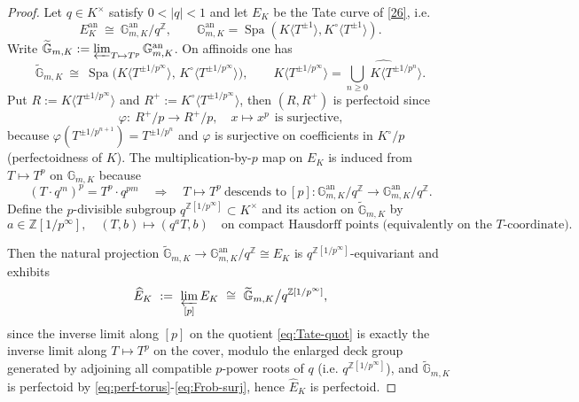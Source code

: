 \documentclass[11pt]{article}
\theoremstyle{remark}
\newcommand{\G}{\mathbb{G}}
\newcommand{\Z}{\mathbb{Z}}
\DeclareMathOperator{\Spa}{Spa}
\newcommand{\an}{\mathrm{an}}
\begin{document}
\begin{proof}
Let $q\in K^\times$ satisfy $0<|q|<1$ and let $E_K$ be the Tate curve of \eqref{26}, i.e.
\begin{equation}\label{eq:Tate-quot}
E_K^{\an}\ \cong\ \G_{m,K}^{\an}/q^{\Z},\qquad \G_{m,K}^{\an}=\Spa(K\langle T^{\pm 1}\rangle,K^\circ\langle T^{\pm 1}\rangle).
\end{equation}
Write $\widetilde{\G}_{m,K}:=\varprojlim_{T\mapsto T^p}\G_{m,K}^{\an}$. On affinoids one has
\begin{equation}\label{eq:perf-torus}
\widetilde{\G}_{m,K}\ \cong\ \Spa\!\bigl(K\langle T^{\pm 1/p^\infty}\rangle,\,K^\circ\langle T^{\pm 1/p^\infty}\rangle\bigr),
\qquad K\langle T^{\pm 1/p^\infty}\rangle=\widehat{\bigcup_{n\ge 0}K\langle T^{\pm 1/p^n}\rangle}.
\end{equation}
Put $R:=K\langle T^{\pm 1/p^\infty}\rangle$ and $R^+:=K^\circ\langle T^{\pm 1/p^\infty}\rangle$, then $(R,R^+)$ is perfectoid since
\begin{equation}\label{eq:Frob-surj}
\varphi:\ R^+/p\longrightarrow R^+/p,\quad x\mapsto x^p\ \ \text{is surjective,}
\end{equation}
because $\varphi(T^{\pm 1/p^{n+1}})=T^{\pm 1/p^n}$ and $\varphi$ is surjective on coefficients in $K^\circ/p$ (perfectoidness of $K$).
The multiplication-by-$p$ map on $E_K$ is induced from $T\mapsto T^p$ on $\G_{m,K}$ because
\begin{equation}\label{eq:p-descend}
(T\cdot q^m)^p=T^p\cdot q^{pm}\quad\Rightarrow\quad T\mapsto T^p\ \text{descends to}\ [p]:\G_{m,K}^{\an}/q^{\Z}\to \G_{m,K}^{\an}/q^{\Z}.
\end{equation}
Define the $p$-divisible subgroup $q^{\Z[1/p^\infty]}\subset K^\times$ and its action on $\widetilde{\G}_{m,K}$ by
\begin{equation}\label{eq:q-action}
a \in \mathbb{Z}[1/p^{\infty}], \quad
(T,b) \longmapsto (q^{a} T, b)
\quad \text{on compact Hausdorff points
(equivalently on the $T$-coordinate).}
\end{equation}

Then the natural projection $\widetilde{\G}_{m,K}\to \G_{m,K}^{\an}/q^\Z\cong E_K$ is $q^{\Z[1/p^\infty]}$-equivariant and exhibits
\begin{equation}\label{eq:perfectoid-Tate-ident}
\widehat{E}_K\ :=\ \varprojlim_{[p]}E_K\ \cong\ \widetilde{\G}_{m,K}\big/q^{\Z[1/p^\infty]},
\end{equation}
since the inverse limit along $[p]$ on the quotient \eqref{eq:Tate-quot} is exactly the inverse limit along $T\mapsto T^p$ on the cover,
modulo the enlarged deck group generated by adjoining all compatible $p$-power roots of $q$ (i.e. $q^{\Z[1/p^\infty]}$), and
$\widetilde{\G}_{m,K}$ is perfectoid by \eqref{eq:perf-torus}-\eqref{eq:Frob-surj}, hence $\widehat{E}_K$ is perfectoid.


\end{proof}
\end{document}
